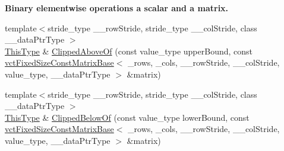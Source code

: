 \begin{Indent}{\bf Binary elementwise operations a scalar and a matrix.}
\begin{DoxyCompactItemize}
\item 
{\footnotesize template$<$stride\-\_\-type \-\_\-\-\_\-row\-Stride, stride\-\_\-type \-\_\-\-\_\-col\-Stride, class \-\_\-\-\_\-data\-Ptr\-Type $>$ }\\\hyperlink{classvct_fixed_size_const_matrix_base_a7ec66a96ed7e08ce9ff54093133c9d8d}{This\-Type} \& \hyperlink{classvct_fixed_size_matrix_base_a810f01578ecafea65c485b5b49fa405a}{Clipped\-Above\-Of} (const value\-\_\-type upper\-Bound, const \hyperlink{classvct_fixed_size_const_matrix_base}{vct\-Fixed\-Size\-Const\-Matrix\-Base}$<$ \-\_\-rows, \-\_\-cols, \-\_\-\-\_\-row\-Stride, \-\_\-\-\_\-col\-Stride, value\-\_\-type, \-\_\-\-\_\-data\-Ptr\-Type $>$ \&matrix)
\item 
{\footnotesize template$<$stride\-\_\-type \-\_\-\-\_\-row\-Stride, stride\-\_\-type \-\_\-\-\_\-col\-Stride, class \-\_\-\-\_\-data\-Ptr\-Type $>$ }\\\hyperlink{classvct_fixed_size_const_matrix_base_a7ec66a96ed7e08ce9ff54093133c9d8d}{This\-Type} \& \hyperlink{classvct_fixed_size_matrix_base_a442058297b9cf2e7da23efeafbcd3e45}{Clipped\-Below\-Of} (const value\-\_\-type lower\-Bound, const \hyperlink{classvct_fixed_size_const_matrix_base}{vct\-Fixed\-Size\-Const\-Matrix\-Base}$<$ \-\_\-rows, \-\_\-cols, \-\_\-\-\_\-row\-Stride, \-\_\-\-\_\-col\-Stride, value\-\_\-type, \-\_\-\-\_\-data\-Ptr\-Type $>$ \&matrix)
\end{DoxyCompactItemize}
\end{Indent}
